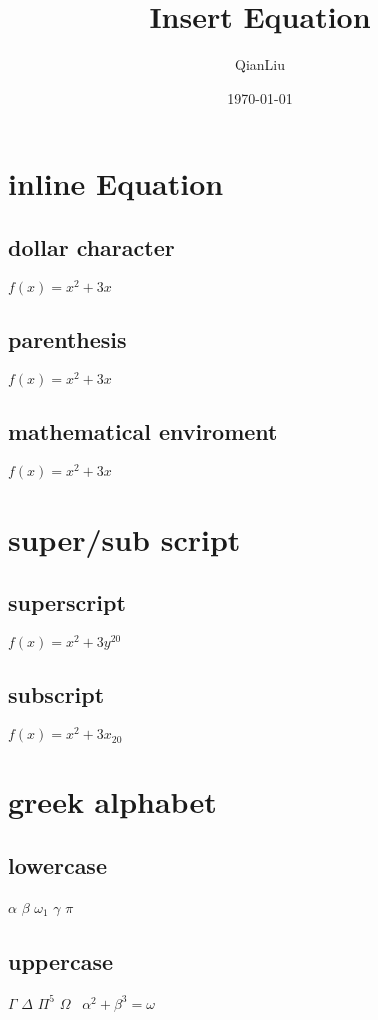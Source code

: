 \documentclass{article}
\author{QianLiu}
\title{Insert Equation}
\date{\today}
\begin{document}
    \maketitle
    \tableofcontents
    
    \section{inline Equation}
    \subsection{dollar character}
    $f(x)=x^2+3x$

    \subsection{parenthesis}
    \(f(x)=x^2+3x\)

    \subsection{mathematical enviroment}
    \begin{math}
        f(x)=x^2+3x
    \end{math}

    \section{super/sub script}
    \subsection{superscript}
    $f(x)=x^2+3y^{20}$

    \subsection{subscript}
    \(f(x)=x^2+3x_{20}\)

    \section{greek alphabet}
    \subsection{lowercase}
    \(\alpha\)
    \(\beta\)
    \(\omega_1\)
    \(\gamma\)
    \(\pi\)

    \subsection{uppercase}
    \(\Gamma\)
    \(\Delta\)
    \(\Pi^5\)
    \(\Omega\)
    \ \(\alpha^2+\beta^3=\omega\)
\end{document}

